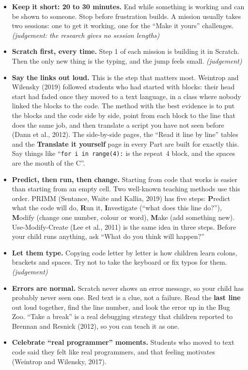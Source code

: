 \begin{itemize}
  \item \textbf{Keep it short: 20 to 30 minutes.} End while something is working and can be shown to someone. Stop before frustration builds. A mission usually takes two sessions: one to get it working, one for the ``Make it yours'' challenges. \textit{(judgement: the research gives no session lengths)}
  \item \textbf{Scratch first, every time.} Step 1 of each mission is building it in Scratch. Then the only new thing is the typing, and the jump feels small. \textit{(judgement)}
  \item \textbf{Say the links out loud.} This is the step that matters most. Weintrop and Wilensky (2019) followed students who had started with blocks: their head start had faded once they moved to a text language, in a class where nobody linked the blocks to the code. The method with the best evidence is to put the blocks and the code side by side, point from each block to the line that does the same job, and then translate a script you have not seen before (Dann et al., 2012). The side-by-side pages, the ``Read it line by line'' tables and the \textbf{Translate it yourself} page in every Part are built for exactly this. Say things like ``\texttt{for i in range(4):} is the repeat~4 block, and the spaces are the mouth of the C''.
  \item \textbf{Predict, then run, then change.} Starting from code that works is easier than starting from an empty cell. Two well-known teaching methods use this order. PRIMM (Sentance, Waite and Kallia, 2019) has five steps: \textbf{P}redict what the code will do, \textbf{R}un it, \textbf{I}nvestigate (``what does this line do?''), \textbf{M}odify (change one number, colour or word), \textbf{M}ake (add something new). Use-Modify-Create (Lee et al., 2011) is the same idea in three steps. Before your child runs anything, ask ``What do you think will happen?''
  \item \textbf{Let them type.} Copying code letter by letter is how children learn colons, brackets and spaces. Try not to take the keyboard or fix typos for them. \textit{(judgement)}
  \item \textbf{Errors are normal.} Scratch never shows an error message, so your child has probably never seen one. Red text is a clue, not a failure. Read the \textbf{last line} out loud together, find the line number, and look the error up in the Bug Zoo. ``Take a break'' is a real debugging strategy that children reported to Brennan and Resnick (2012), so you can teach it as one.
  \item \textbf{Celebrate ``real programmer'' moments.} Students who moved to text code said they felt like real programmers, and that feeling motivates (Weintrop and Wilensky, 2017).
\end{itemize}

